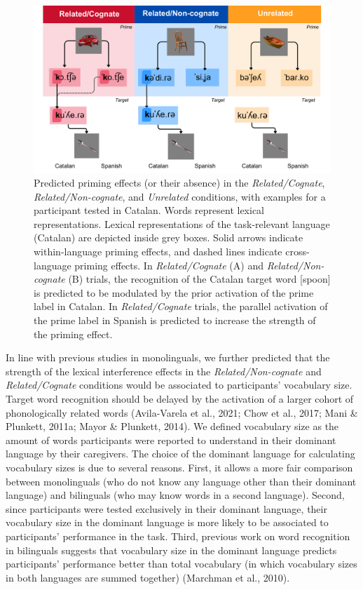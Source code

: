 \documentclass[
  12pt,
  b5paperpaper,
  twoside]{scrreprt}
\begin{document}
\begin{figure}

{\centering \includegraphics{chapters/../_assets/img/hypotheses.png}

}

\caption{\label{fig-hypotheses}Predicted priming effects (or their
absence) in the \emph{Related/Cognate}, \emph{Related/Non-cognate}, and
\emph{Unrelated} conditions, with examples for a participant tested in
Catalan. Words represent lexical representations. Lexical
representations of the task-relevant language (Catalan) are depicted
inside grey boxes. Solid arrows indicate within-language priming
effects, and dashed lines indicate cross-language priming effects. In
\emph{Related/Cognate} (A) and \emph{Related/Non-cognate} (B) trials,
the recognition of the Catalan target word 
{[}spoon{]} is predicted to be modulated by the prior activation of the
prime label in Catalan. In \emph{Related/Cognate} trials, the parallel
activation of the prime label in Spanish is predicted to increase the
strength of the priming effect.}

\end{figure}

In line with previous studies in monolinguals, we further predicted that
the strength of the lexical interference effects in the
\emph{Related/Non-cognate} and \emph{Related/Cognate} conditions would
be associated to participants' vocabulary size. Target word recognition
should be delayed by the activation of a larger cohort of phonologically
related words (Avila-Varela et al., 2021; Chow et al., 2017; Mani \&
Plunkett, 2011a; Mayor \& Plunkett, 2014). We defined vocabulary size as
the amount of words participants were reported to understand in their
dominant language by their caregivers. The choice of the dominant
language for calculating vocabulary sizes is due to several reasons.
First, it allows a more fair comparison between monolinguals (who do not
know any language other than their dominant language) and bilinguals
(who may know words in a second language). Second, since participants
were tested exclusively in their dominant language, their vocabulary
size in the dominant language is more likely to be associated to
participants' performance in the task. Third, previous work on word
recognition in bilinguals suggests that vocabulary size in the dominant
language predicts participants' performance better than total vocabulary
(in which vocabulary sizes in both languages are summed together)
(Marchman et al., 2010).
\end{document}

